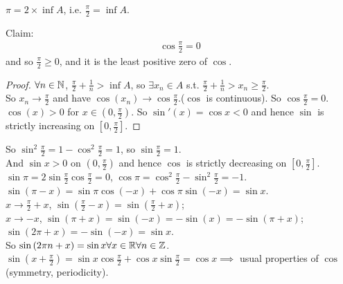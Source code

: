 \documentclass[a4paper]{article}
\begin{document}
\begin{defi}
$\pi = 2\times \inf A$, i.e. $\frac{\pi}{2} = \inf A$.
\end{defi}
Claim:
\begin{equation*}
\begin{aligned}
\cos\frac{\pi}{2} = 0
\end{aligned}
\end{equation*}
and so $\frac{\pi}{2}\geq 0$, and it is the least positive zero of $\cos$.\\
\begin{proof}
$\forall n\in\mathbb{N}$, $\frac{\pi}{2}+\frac{1}{n} > \inf A$, so $\exists x_n \in A$ s.t. $\frac{\pi}{2} + \frac{1}{n} > x_n \geq \frac{\pi}{2}$.\\
So $x_n \to \frac{\pi}{2}$ and have $\cos \left(x_n\right) \to \cos\frac{\pi}{2}$.($\cos$ is continuous). So $\cos\frac{\pi}{2} = 0$.\\
$\cos\left(x\right)>0$ for $x\in\left(0,\frac{\pi}{2}\right)$. So $\sin'\left(x\right)=\cos x<0$ and hence $\sin$ is strictly increasing on $[0,\frac{\pi}{2}]$.
\end{proof}
So $\sin^2\frac{\pi}{2} = 1-\cos^2\frac{\pi}{2}=1$, so $\sin\frac{\pi}{2} = 1$.\\
And $\sin x>0$ on $\left(0,\frac{\pi}{2}\right)$ and hence $\cos$ is strictly decreasing on $[0,\frac{\pi}{2}]$.\\
$\sin\pi = 2\sin\frac{\pi}{2}\cos\frac{\pi}{2}=0$, $\cos\pi=\cos^2\frac{\pi}{2}-\sin^2\frac{\pi}{2}=-1$.\\
$\sin\left(\pi-x\right)=\sin\pi\cos\left(-x\right)+\cos\pi\sin\left(-x\right)=\sin x$.\\
$x\to\frac{\pi}{2}+x$, $\sin\left(\frac{\pi}{2}-x\right) =\sin\left(\frac{\pi}{2}+x\right)$;\\
$x\to -x$, $\sin\left(\pi+x\right)=\sin\left(-x\right)=-\sin\left(x\right)=-\sin\left(\pi+x\right)$;\\
$\sin\left(2\pi+x\right)=-\sin\left(-x\right)=\sin x$.\\
So $\sin\left(2\pi n+x\right)=\sin x \forall x\in \mathbb{R} \forall n\in\mathbb{Z}$.\\
$\sin\left(x+\frac{\pi}{2}\right)=\sin x\cos\frac{\pi}{2} + \cos x \sin \frac{\pi}{2} = \cos x \implies$ usual properties of $\cos$ (symmetry, periodicity).
\end{document}
